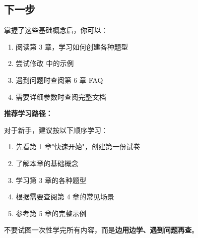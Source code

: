 \subsection{下一步}

掌握了这些基础概念后，你可以：

\begin{enumerate}
  \item 阅读第 3 章，学习如何创建各种题型
  \item 尝试修改  中的示例
  \item 遇到问题时查阅第 6 章 FAQ
  \item 需要详细参数时查阅完整文档 
\end{enumerate}

\textbf{推荐学习路径：}

对于新手，建议按以下顺序学习：
\begin{enumerate}
  \item 先看第 1 章"快速开始"，创建第一份试卷
  \item 了解本章的基础概念
  \item 学习第 3 章的各种题型
  \item 根据需要查阅第 4 章的常见场景
  \item 参考第 5 章的完整示例
\end{enumerate}

不要试图一次性学完所有内容，而是\textbf{边用边学、遇到问题再查}。
